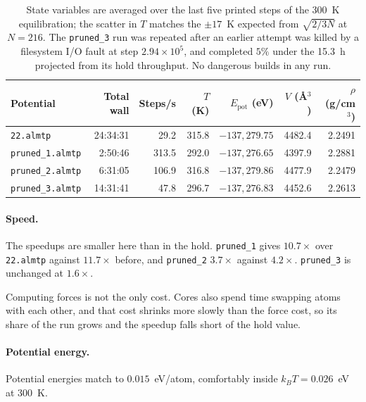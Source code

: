 \documentclass{article}
\begin{document}
\begin{table}[H]
\centering
\small
\begin{tabular}{l|r|r|r|r|r|r}
\toprule
Potential & Total wall & Steps/s\footnotemark{} & $T$ (K) & $E_{\text{pot}}$ (eV) & $V$ (\AA$^3$) & $\rho$ (g/cm$^3$) \\
\midrule
\texttt{22.almtp}        & 24:34:31 & 29.2  & 315.8 & $-137{,}279.75$ & 4482.4 & 2.2491 \\
\texttt{pruned\_1.almtp} & 2:50:46  & 313.5 & 292.0 & $-137{,}276.65$ & 4397.9 & 2.2881 \\
\texttt{pruned\_2.almtp} & 6:31:05  & 106.9 & 316.8 & $-137{,}279.86$ & 4477.9 & 2.2479 \\
\texttt{pruned\_3.almtp} & 14:31:41 & 47.8  & 296.7 & $-137{,}276.83$ & 4452.6 & 2.2613 \\
\bottomrule
\end{tabular}
\caption{State variables are averaged over the last five printed steps of the 300~K equilibration; the scatter in $T$ matches the $\pm17$~K expected from $\sqrt{2/3N}$ at $N = 216$. The \texttt{pruned\_3} run was repeated after an earlier attempt was killed by a filesystem I/O fault at step $2.94\times10^{5}$, and completed $5\%$ under the 15.3~h projected from its hold throughput. No dangerous builds in any run.}
\label{tab:quench_bench}
\end{table}
\addtocounter{footnote}{-1}

\paragraph{Speed.}
The speedups are smaller here than in the hold. \texttt{pruned\_1} gives $10.7\times$ over \texttt{22.almtp} against $11.7\times$ before, and \texttt{pruned\_2} $3.7\times$ against $4.2\times$. \texttt{pruned\_3} is unchanged at $1.6\times$.

Computing forces is not the only cost. Cores also spend time swapping atoms with each other, and that cost shrinks more slowly than the force cost, so its share of the run grows and the speedup falls short of the hold value.
\paragraph{Potential energy.}
Potential energies match to $0.015$~eV/atom, comfortably inside $k_BT = 0.026$~eV at 300~K.
\end{document}
